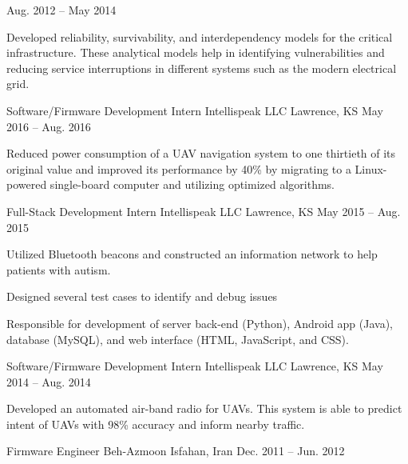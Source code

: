 \begin{cventries}
{      Aug. 2012 -- May 2014
    }
    {
      \begin{cvitems}
        \item Developed reliability, survivability, and interdependency models for the critical infrastructure. These analytical models help in identifying vulnerabilities and reducing service interruptions in different systems such as the modern electrical grid.
      \end{cvitems}
    }
  \cventry
    {Software/Firmware Development Intern}
    {Intellispeak LLC}
    {Lawrence, KS}
    {May 2016 -- Aug. 2016}
    {
      \begin{cvitems}
        \item Reduced power consumption of a UAV navigation system to one thirtieth of its original value and improved its performance by 40\% by migrating to a Linux-powered single-board computer and utilizing optimized algorithms.
      \end{cvitems}
    }
  \cventry
    {Full-Stack Development Intern}
    {Intellispeak LLC}
    {Lawrence, KS}
    {May 2015 -- Aug. 2015}
    {
      \begin{cvitems}
        \item Utilized Bluetooth beacons and constructed an information network to help patients with autism.
        \item Designed several test cases to identify and debug issues
        \item Responsible for development of server back-end (Python), Android app (Java), database (MySQL), and web interface (HTML, JavaScript, and CSS).
      \end{cvitems}
    }
  \cventry
    {Software/Firmware Development Intern}
    {Intellispeak LLC}
    {Lawrence, KS}
    {May 2014 -- Aug. 2014}
    {
      \begin{cvitems}
        \item Developed an automated air-band radio for UAVs. This system is able to predict intent of UAVs with 98\% accuracy and inform nearby traffic.
      \end{cvitems}
    }
  \cventry
    {Firmware Engineer}
    {Beh-Azmoon}
    {Isfahan, Iran}
    {Dec. 2011 -- Jun. 2012}
    {
      \begin{cvitems}

\end{cvitems}}
\end{cventries}
